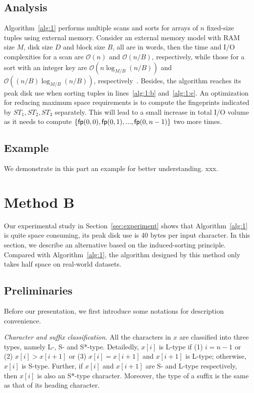 \documentclass[10pt,journal,compsoc]{IEEEtran}
\begin{document}
\subsection{Analysis} \label{sec:method1:analysis}

Algorithm~\ref{alg:1} performs multiple scans and sorts for arrays of $n$ fixed-size tuples using external memory. Consider an external memory model with RAM size $M$, disk size $D$ and block size $B$, all are in words, then the time and I/O complexities for a scan are $\mathcal{O}(n)$ and $\mathcal{O}(n / B)$, respectively, while those for a sort with an integer key are $\mathcal{O}(n\log_{M/ B}(n / B))$ and $\mathcal{O}((n / B)\log_{M / B}(n / B))$, respectively~\cite{Arge2013}. Besides, the algorithm reaches its peak disk use when sorting tuples in lines~\ref{alg:1:b} and~\ref{alg:1:e}. An optimization for reducing maximum space requirements is to compute the fingeprints indicated by $ST_1, ST_2, ST_3$ separately. This will lead to a small increase in total I/O volume as it needs to compute $\{{\sf fp}(0, 0), {\sf fp}(0, 1), ..., {\sf fp}(0, n - 1)\}$ two more times.

	
\subsection{Example} \label{sec:method1:example}

We demonstrate in this part an example for better understanding. xxx.
	
	
\section{Method B} \label{sec:method2}

Our experimental study in Section~\ref{sec:experiment} shows that Algorithm~\ref{alg:1} is quite space consuming, its peak disk use is 40 bytes per input character. In this section, we describe an alternative based on the induced-sorting principle. Compared with Algorithm~\ref{alg:1}, the algorithm designed by this method only takes half space on real-world datasets.

\subsection{Preliminaries} \label{sec:method2:preliminaries}

Before our presentation, we first introduce some notations for description convenience.

{\em Character and suffix classification.} All the characters in $x$ are classified into three types, namely L-, S- and S*-type. Detailedly, $x[i]$ is L-type if (1) $i = n - 1$ or (2) $x[i] > x[i + 1]$ or (3) $x[i] = x[i + 1]$ and $x[i + 1]$ is L-type; otherwise, $x[i]$ is S-type. Further, if $x[i]$ and $x[i + 1]$ are S- and L-type respectively, then $x[i]$ is also an S*-type character. Moreover, the type of a suffix is the same as that of its heading character.
\end{document}

